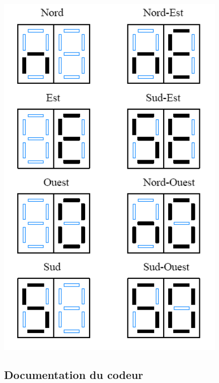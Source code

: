 \documentclass[10pt]{article}
\begin{document}
\begin{minipage}[c]{.28\linewidth}

\begin{center}
\includegraphics[width=.9\textwidth]{images/Orientations}
\end{center}
\end{minipage} 



\subsection*{Documentation du codeur}
\end{document}
